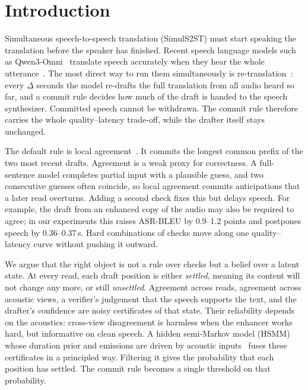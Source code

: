 \section{Introduction}
\label{sec:intro}

Simultaneous speech-to-speech translation (SimulS2ST) must start speaking the translation before the speaker has finished.
Recent speech language models such as Qwen3-Omni~\citep{xu2025qwen3omni} translate speech accurately when they hear the whole utterance~\citep{uniss2025}.
The most direct way to run them simultaneously is re-translation~\citep{arivazhagan2020retranslation,machacek2023turning}: every $\Delta$ seconds the model re-drafts the full translation from all audio heard so far, and a commit rule decides how much of the draft is handed to the speech synthesizer.
Committed speech cannot be withdrawn.
The commit rule therefore carries the whole quality--latency trade-off, while the drafter itself stays unchanged.

The default rule is local agreement~\citep{liu2020low,polak2022cuni}.
It commits the longest common prefix of the two most recent drafts.
Agreement is a weak proxy for correctness.
A full-sentence model completes partial input with a plausible guess, and two consecutive guesses often coincide, so local agreement commits anticipations that a later read overturns.
Adding a second check fixes this but delays speech.
For example, the draft from an enhanced copy of the audio may also be required to agree; in our experiments this raises ASR-BLEU by 0.9--1.2 points and postpones speech by 0.36--0.37\,s.
Hard combinations of checks move along one quality--latency curve without pushing it outward.

We argue that the right object is not a rule over checks but a belief over a latent state.
At every read, each draft position is either \emph{settled}, meaning its content will not change any more, or still \emph{unsettled}.
Agreement across reads, agreement across acoustic views, a verifier's judgement that the speech supports the text, and the drafter's confidence are noisy certificates of that state.
Their reliability depends on the acoustics: cross-view disagreement is harmless when the enhancer works hard, but informative on clean speech.
A hidden semi-Markov model (HSMM)~\citep{yu2010hsmm} whose duration prior and emissions are driven by acoustic inputs~\citep{bengio1995iohmm} fuses these certificates in a principled way.
Filtering it gives the probability that each position has settled.
The commit rule becomes a single threshold on that probability.

